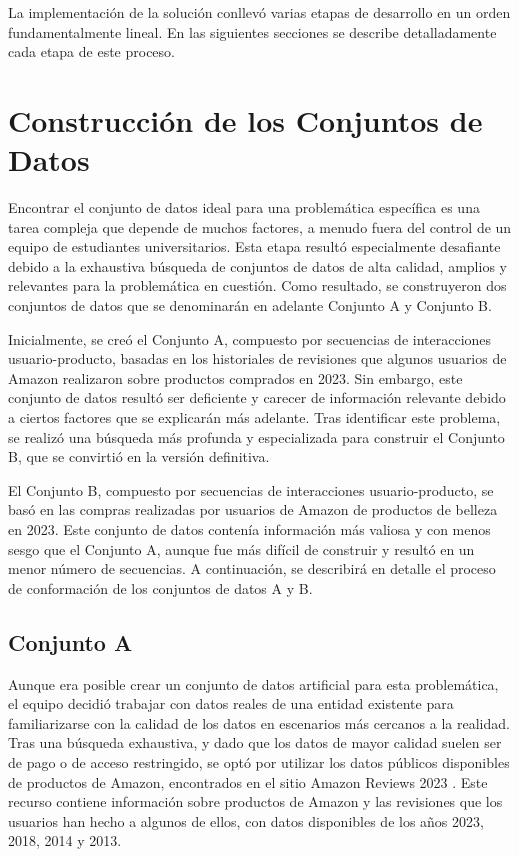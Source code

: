 \documentclass[runningheads]{llncs}
\begin{document}
La implementación de la solución conllevó varias etapas de desarrollo en un orden fundamentalmente lineal. En las siguientes secciones se describe detalladamente cada etapa de este proceso.

\section{Construcción de los Conjuntos de Datos}

Encontrar el conjunto de datos ideal para una problemática específica es una tarea compleja que depende de muchos factores, a menudo fuera del control de un equipo de estudiantes universitarios. Esta etapa resultó especialmente desafiante debido a la exhaustiva búsqueda de conjuntos de datos de alta calidad, amplios y relevantes para la problemática en cuestión. Como resultado, se construyeron dos conjuntos de datos que se denominarán en adelante Conjunto A y Conjunto B.

Inicialmente, se creó el Conjunto A, compuesto por secuencias de interacciones usuario-producto, basadas en los historiales de revisiones que algunos usuarios de Amazon realizaron sobre productos comprados en 2023. Sin embargo, este conjunto de datos resultó ser deficiente y carecer de información relevante debido a ciertos factores que se explicarán más adelante. Tras identificar este problema, se realizó una búsqueda más profunda y especializada para construir el Conjunto B, que se convirtió en la versión definitiva.

El Conjunto B, compuesto por secuencias de interacciones usuario-producto, se basó en las compras realizadas por usuarios de Amazon de productos de belleza en 2023. Este conjunto de datos contenía información más valiosa y con menos sesgo que el Conjunto A, aunque fue más difícil de construir y resultó en un menor número de secuencias. A continuación, se describirá en detalle el proceso de conformación de los conjuntos de datos A y B.

\subsection{Conjunto A}

Aunque era posible crear un conjunto de datos artificial para esta problemática, el equipo decidió trabajar con datos reales de una entidad existente para familiarizarse con la calidad de los datos en escenarios más cercanos a la realidad. Tras una búsqueda exhaustiva, y dado que los datos de mayor calidad suelen ser de pago o de acceso restringido, se optó por utilizar los datos públicos disponibles de productos de Amazon, encontrados en el sitio Amazon Reviews 2023 . Este recurso contiene información sobre productos de Amazon y las revisiones que los usuarios han hecho a algunos de ellos, con datos disponibles de los años 2023, 2018, 2014 y 2013.
\end{document}
